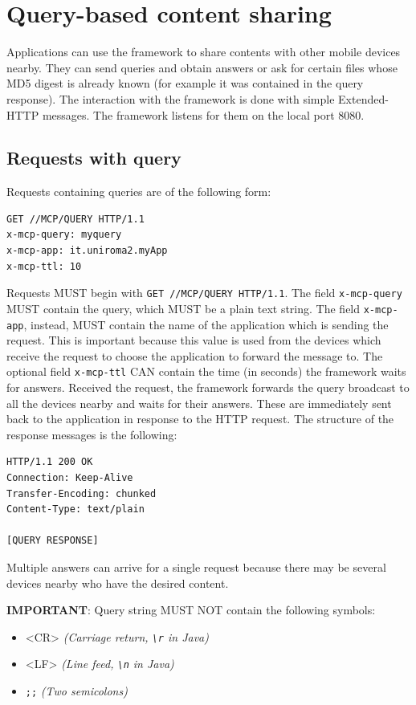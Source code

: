 \documentclass[12pt, a4paper, oneside]{book}
\begin{document}
\chapter{Query-based content sharing}
Applications can use the framework to share contents with other mobile devices nearby. They can send queries and obtain answers or ask for certain files whose MD5 digest is already known (for example it was contained in the query response).
The interaction with the framework is done with simple Extended-HTTP messages. The framework listens for them on the local port 8080.

\section{Requests with query}
Requests containing queries are of the following form:
\begin{verbatim}
GET //MCP/QUERY HTTP/1.1
x-mcp-query: myquery
x-mcp-app: it.uniroma2.myApp
x-mcp-ttl: 10
\end{verbatim}
Requests MUST begin with \texttt{GET //MCP/QUERY HTTP/1.1}. The field \texttt{x-mcp-query} MUST contain the query, which MUST be a plain text string. The field \texttt{x-mcp-app}, instead, MUST contain the name of the application which is sending the request. This is important because this value is used from the devices which receive the request to choose the application to forward the message to. The optional field \texttt{x-mcp-ttl} CAN contain the time (in seconds) the framework waits for answers.
Received the request, the framework forwards the query broadcast to all the devices nearby and waits for their answers. These are immediately sent back to the application in response to the HTTP request.
The structure of the response messages is the following:
\begin{verbatim}
HTTP/1.1 200 OK
Connection: Keep-Alive
Transfer-Encoding: chunked
Content-Type: text/plain

[QUERY RESPONSE]
\end{verbatim}
Multiple answers can arrive for a single request because there may be several devices nearby who have the desired content.

\newpage
\begin{framed}
\textbf{IMPORTANT}: Query string MUST NOT contain the following symbols:
\begin{itemize}
\item <CR> \textit{ (Carriage return, \texttt{\textbackslash r} in Java)}
\item <LF> \textit{ (Line feed, \texttt{\textbackslash n} in Java)}
\item \texttt{;;} \textit{ (Two semicolons)}
\end{itemize}
\end{framed}
\end{document}
